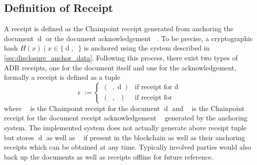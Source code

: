 \documentclass[12pt,msc,a4paper,oneside]{ucl_thesis}
\DeclareMathOperator{\receipt}{r}
\DeclareMathOperator{\doc}{d}
\DeclareMathOperator{\docack}{d^*}
\DeclareMathOperator{\docreceipt}{\receipt_{\doc}}
\DeclareMathOperator{\docackreceipt}{\receipt_{\docack}}
\begin{document}
\subsection{Definition of Receipt} \label{sec:definition_of_receipt}
A receipt is defined as the Chainpoint receipt generated from anchoring the document $\doc$ or the document acknowledgement $\docack$. To be precise, a cryptographic hash $H(x) \mid x \in \{\doc, \docack\}$ is anchored using the system described in \ref{sec:disclosure_anchor_data}. 
Following this process, there exist two types of ADR receipts, one for the document itself and one for the acknowledgement, formally a receipt is defined as a tuple
\begin{equation}
    \receipt := \begin{cases}
        (\docreceipt, \doc) & \textrm{if receipt for } \doc \\
        (\docackreceipt, \docack) & \textrm{if receipt for }  \docack
    \end{cases}
\end{equation}
where $\docreceipt$ is the Chainpoint receipt for the document $\doc$ and $\docackreceipt$ is the Chainpoint receipt for the document receipt acknowledgement $\docack$ generated by the anchoring system. The implemented system does not actually generate above receipt tuple but stores $\doc$ as well as $\docack$ if present in the blockchain as well as their anchoring receipts which can be obtained at any time. Typically involved parties would also back up the documents as well as receipts offline for future reference.
\end{document}
